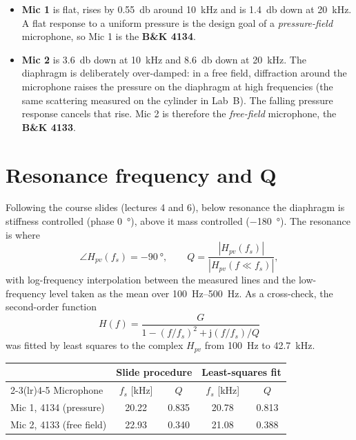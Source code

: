 \documentclass[a4paper,10pt]{article}
\begin{document}
\begin{itemize}
\item \textbf{Mic 1} is flat, rises by \SI{0.55}{\decibel} around \SI{10}{\kilo\hertz}
and is \SI{1.4}{\decibel} down at \SI{20}{\kilo\hertz}. A flat response to a uniform
pressure is the design goal of a \emph{pressure-field} microphone, so Mic 1 is the
\textbf{B\&K 4134}.
\item \textbf{Mic 2} is \SI{3.6}{\decibel} down at \SI{10}{\kilo\hertz} and
\SI{8.6}{\decibel} down at \SI{20}{\kilo\hertz}. The diaphragm is deliberately
over-damped: in a free field, diffraction around the microphone raises the pressure on
the diaphragm at high frequencies (the same scattering measured on the cylinder in
Lab~B). The falling pressure response cancels that rise. Mic 2 is therefore the
\emph{free-field} microphone, the \textbf{B\&K 4133}.
\end{itemize}

\section{Resonance frequency and Q}
Following the course slides (lectures 4 and 6), below resonance the diaphragm is
stiffness controlled (phase \SI{0}{\degree}), above it mass controlled
(\SI{-180}{\degree}). The resonance is where
\begin{equation}
\angle H_{pv}(f_s) = \SI{-90}{\degree},\qquad
Q=\frac{|H_{pv}(f_s)|}{|H_{pv}(f\ll f_s)|},
\end{equation}
with log-frequency interpolation between the measured lines and the low-frequency level
taken as the mean over \SI{100}{\hertz}--\SI{500}{\hertz}. As a cross-check, the
second-order function
\begin{equation}
H(f)=\frac{G}{1-(f/f_s)^2+\mathrm{j}(f/f_s)/Q}
\end{equation}
was fitted by least squares to the complex $H_{pv}$ from \SI{100}{\hertz} to
\SI{42.7}{\kilo\hertz}.

\begin{table}[H]\centering
\begin{tabular}{lcccc}\toprule
& \multicolumn{2}{c}{Slide procedure} & \multicolumn{2}{c}{Least-squares fit}\\
\cmidrule(lr){2-3}\cmidrule(lr){4-5}
Microphone & $f_s$ [kHz] & $Q$ & $f_s$ [kHz] & $Q$\\\midrule
Mic 1, 4134 (pressure) & 20.22 & 0.835 & 20.78 & 0.813\\
Mic 2, 4133 (free field) & 22.93 & 0.340 & 21.08 & 0.388\\\bottomrule
\end{tabular}
\end{table}
\end{document}
